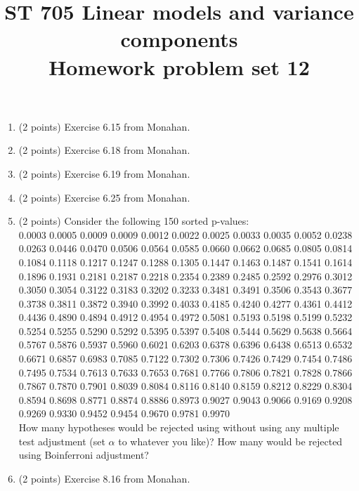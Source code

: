 \documentclass[11pt]{article}
\title{ST 705 Linear models and variance components \\ 
        Homework problem set 12}
\begin{document}
\maketitle

\begin{enumerate}

\item(2 points) Exercise 6.15 from Monahan.

\item(2 points) Exercise 6.18 from Monahan.

\item(2 points) Exercise 6.19 from Monahan.

\item(2 points) Exercise 6.25 from Monahan.

\item(2 points) Consider the following 150 sorted p-values: \\
0.0003 0.0005 0.0009 0.0009 0.0012 0.0022 0.0025 0.0033 0.0035 0.0052 0.0238 0.0263 0.0446 0.0470 0.0506 0.0564 0.0585 0.0660 0.0662 0.0685 0.0805 0.0814 0.1084 0.1118 0.1217 0.1247 0.1288 0.1305 0.1447 0.1463 0.1487 0.1541 0.1614 0.1896 0.1931 0.2181 0.2187 0.2218 0.2354 0.2389 0.2485 0.2592 0.2976 0.3012 0.3050 0.3054 0.3122 0.3183 0.3202 0.3233 0.3481 0.3491 0.3506 0.3543 0.3677 0.3738 0.3811 0.3872 0.3940 0.3992 0.4033 0.4185 0.4240 0.4277 0.4361 0.4412 0.4436 0.4890 0.4894 0.4912 0.4954 0.4972 0.5081 0.5193 0.5198 0.5199 0.5232 0.5254 0.5255 0.5290 0.5292 0.5395 0.5397 0.5408 0.5444 0.5629 0.5638 0.5664 0.5767 0.5876 0.5937 0.5960 0.6021 0.6203 0.6378 0.6396 0.6438 0.6513 0.6532 0.6671 0.6857 0.6983 0.7085 0.7122 0.7302 0.7306 0.7426 0.7429 0.7454 0.7486 0.7495 0.7534 0.7613 0.7633 0.7653 0.7681 0.7766 0.7806 0.7821 0.7828 0.7866 0.7867 0.7870 0.7901 0.8039 0.8084 0.8116 0.8140 0.8159 0.8212 0.8229 0.8304 0.8594 0.8698 0.8771 0.8874 0.8886 0.8973 0.9027 0.9043 0.9066 0.9169 0.9208 0.9269 0.9330 0.9452 0.9454 0.9670 0.9781 0.9970 \\
How many hypotheses would be rejected using without using any multiple test adjustment (set $\alpha$ to whatever you like)?  How many would be rejected using Boinferroni adjustment?

\item(2 points) Exercise 8.16 from Monahan.

\end{enumerate}
\end{document}
